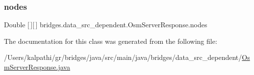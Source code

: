 \subsubsection{\texorpdfstring{nodes}{nodes}}
{\footnotesize\ttfamily Double \mbox{[}$\,$\mbox{]}\mbox{[}$\,$\mbox{]} bridges.\+data\+\_\+src\+\_\+dependent.\+Osm\+Server\+Response.\+nodes}



The documentation for this class was generated from the following file\+:\begin{DoxyCompactItemize}
\item 
/\+Users/kalpathi/gr/bridges/java/src/main/java/bridges/data\+\_\+src\+\_\+dependent/\mbox{\hyperlink{_osm_server_response_8java}{Osm\+Server\+Response.\+java}}\end{DoxyCompactItemize}
